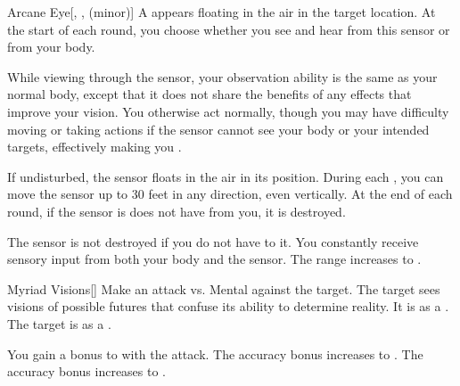 \lowercase{\hypertarget{spell:Arcane Eye}{}}\label{spell:Arcane Eye}
\begin{freeability}[Rank 1]{\hypertarget{spell:Arcane Eye}{Arcane Eye}}[, ,  (minor)]
A  appears floating in the air in the target location.
At the start of each round, you choose whether you see and hear from this sensor or from your body.

While viewing through the sensor, your observation ability is the same as your normal body, except that it does not share the benefits of any  effects that improve your vision.
You otherwise act normally, though you may have difficulty moving or taking actions if the sensor cannot see your body or your intended targets, effectively making you \blinded.

If undisturbed, the sensor floats in the air in its position.
During each , you can move the sensor up to 30 feet in any direction, even vertically.
At the end of each round, if the sensor is does not have  from you, it is destroyed.

\rankline
{} The sensor is not destroyed if you do not have  to it.
 You constantly receive sensory input from both your body and the sensor.
 The range increases to \rnglong.
\end{freeability}
\vspace{0.25em}



\lowercase{\hypertarget{spell:Myriad Visions}{}}\label{spell:Myriad Visions}
\begin{freeability}[Rank 1]{\hypertarget{spell:Myriad Visions}{Myriad Visions}}[]
Make an attack vs. Mental against the target.
\hit The target sees visions of possible futures that confuse its ability to determine reality.
It is  as a .
\crit The target is  as a .

\rankline
{} You gain a  bonus to  with the attack.
 The accuracy bonus increases to .
 The accuracy bonus increases to .
\end{freeability}
\vspace{0.25em}



